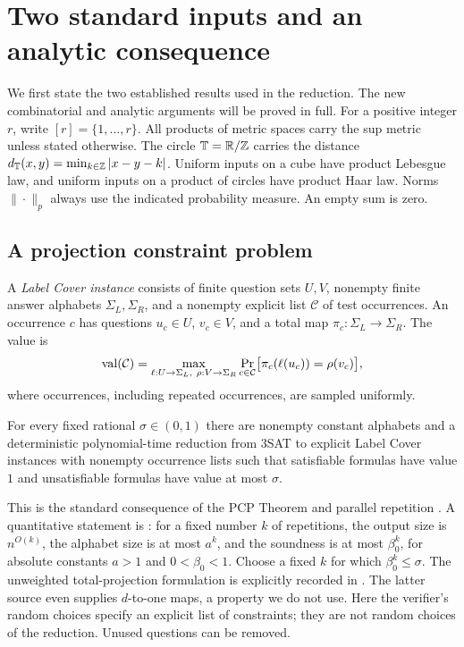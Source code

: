 \section{Two standard inputs and an analytic consequence}
\label{sec:preliminaries}

We first state the two established results used in the reduction.
The new combinatorial and analytic arguments will be proved in full.
For a positive integer $r$, write $[r]=\{1,\ldots,r\}$.
All products of metric spaces carry the sup metric unless stated otherwise.
The circle $\mathbb T=\mathbb R/\mathbb Z$ carries the distance
$d_{\mathbb T}(x,y)=\min_{k\in\mathbb Z}|x-y-k|$.
Uniform inputs on a cube have product Lebesgue law, and uniform inputs on
a product of circles have product Haar law. Norms $\|\cdot\|_p$
always use the indicated probability measure.
An empty sum is zero.

\subsection{A projection constraint problem}

A \emph{Label Cover instance} consists of finite question sets $U,V$,
nonempty finite answer alphabets $\Sigma_L,\Sigma_R$, and a nonempty
explicit list $\mathcal C$ of test occurrences.
An occurrence $c$ has questions $u_c\in U$, $v_c\in V$, and a total map
$\pi_c:\Sigma_L\to\Sigma_R$.
The value is
\[
 \operatorname{val}(\mathcal C)=
 \max_{\ell:U\to\Sigma_L,\ \rho:V\to\Sigma_R}
 \Pr_{c\in\mathcal C}\bigl[\pi_c(\ell(u_c))=\rho(v_c)\bigr],
\]
where occurrences, including repeated occurrences, are sampled uniformly.

\begin{theorem}\label{thm:label-cover}
For every fixed rational $\sigma\in(0,1)$ there are nonempty constant
alphabets and a deterministic polynomial-time reduction from $3$SAT to
explicit Label Cover instances with nonempty occurrence lists such that
satisfiable formulas have value $1$ and unsatisfiable formulas have value
at most $\sigma$.
\end{theorem}

This is the standard consequence of the PCP Theorem and parallel
repetition \cite{AroraEtAl1998,Raz1998}. A quantitative statement is
\cite[Theorem~6.2, full version]{DinurSteurer2014}:
for a fixed number $k$ of repetitions, the output size is $n^{O(k)}$,
the alphabet size is at most $a^k$, and the soundness is at most $\beta_0^k$,
for absolute constants $a>1$ and $0<\beta_0<1$.
Choose a fixed $k$ for which $\beta_0^k\le\sigma$.
The unweighted total-projection formulation is explicitly recorded in
\cite[Definitions~1.1--1.2 and Theorem~1.3]{DKKMS2025}.
The latter source even supplies $d$-to-one maps, a property we do not use.
Here the verifier's random choices specify an explicit list of constraints;
they are not random choices of the reduction.
Unused questions can be removed.

